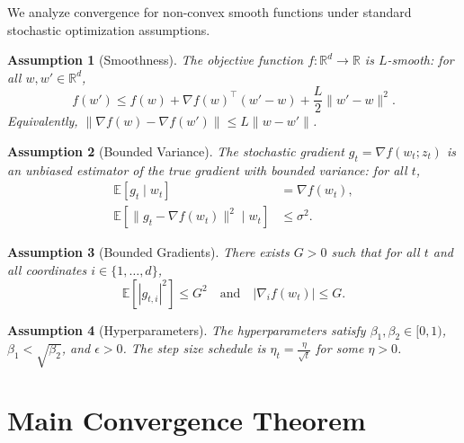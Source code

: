 \documentclass{article}
\newtheorem{assumption}{Assumption}
\begin{document}
We analyze convergence for non-convex smooth functions under standard stochastic optimization assumptions.

\begin{assumption}[Smoothness] \label{assump:smooth}
The objective function $f: \mathbb{R}^d \to \mathbb{R}$ is $L$-smooth: for all $w, w' \in \mathbb{R}^d$,
\begin{equation}
    f(w') \le f(w) + \nabla f(w)^\top (w' - w) + \frac{L}{2} \|w' - w\|^2.
\end{equation}
Equivalently, $\|\nabla f(w) - \nabla f(w')\| \le L \|w - w'\|$.
\end{assumption}

\begin{assumption}[Bounded Variance] \label{assump:variance}
The stochastic gradient $g_t = \nabla f(w_t; z_t)$ is an unbiased estimator of the true gradient with bounded variance: for all $t$,
\begin{align}
    \mathbb{E}[g_t \mid w_t] &= \nabla f(w_t), \\
    \mathbb{E}[\|g_t - \nabla f(w_t)\|^2 \mid w_t] &\le \sigma^2.
\end{align}
\end{assumption}

\begin{assumption}[Bounded Gradients] \label{assump:bounded_grad}
There exists $G > 0$ such that for all $t$ and all coordinates $i \in \{1,\dots,d\}$,
\begin{equation}
    \mathbb{E}[|g_{t,i}|^2] \le G^2 \quad \text{and} \quad |\nabla_i f(w_t)| \le G.
\end{equation}
\end{assumption}

\begin{assumption}[Hyperparameters] \label{assump:hyper}
The hyperparameters satisfy $\beta_1, \beta_2 \in [0,1)$, $\beta_1 < \sqrt{\beta_2}$, and $\epsilon > 0$. The step size schedule is $\eta_t = \frac{\eta}{\sqrt{t}}$ for some $\eta > 0$.
\end{assumption}

\section*{Main Convergence Theorem}
\end{document}
